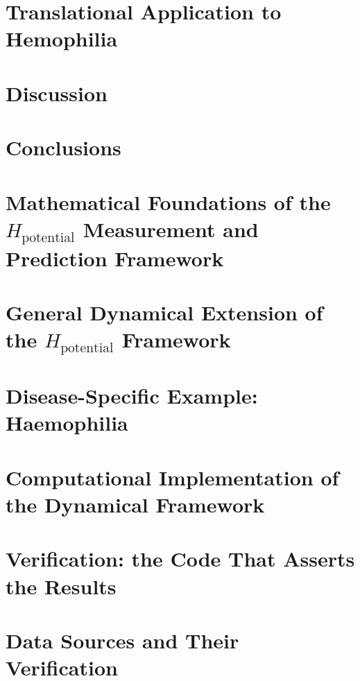 \documentclass{wits} %
\renewcommand{\cleardoublepage}{\clearpage}
\begin{document}
\chapter{Translational Application to Hemophilia} \label{chap:application_the_clotting_factor_model}


\chapter{Discussion}
\label{chap:conclusion}


\chapter{Conclusions}
\label{chap:implementation}





\appendix

\chapter{Mathematical Foundations of the $H_{\text{potential}}$ Measurement and Prediction Framework}


\chapter{General Dynamical Extension of the $H_{\text{potential}}$ Framework}


\chapter{Disease-Specific Example: Haemophilia}


\chapter{Computational Implementation of the Dynamical Framework}


\chapter{Verification: the Code That Asserts the Results}


\chapter{Data Sources and Their Verification}




\cleardoublepage
{}


\end{document}
